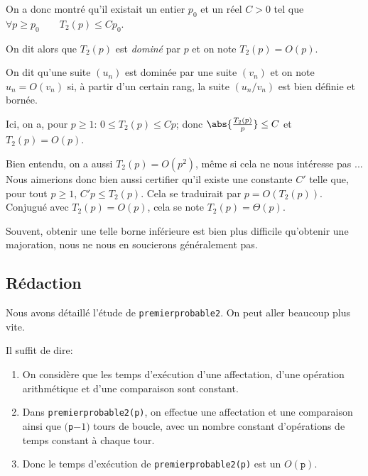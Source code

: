 
On a donc montré qu'il existait un entier $p_{0}$ et un réel $C>0$ tel que
$  \forall p\geq p_0 \qquad T_{2}(p)\leq Cp_0$.

On dit alors que $T_{2}(p)$ est \emph{dominé} par $p$ et on note
$  T_{2}(p) = O(p)$.

\begin{defi}{}
  On dit qu'une suite $(u_{n})$ est dominée par une suite $(v_{n})$ et
  on note $u_{n} = O(v_{n})$ si,  à partir d'un certain rang, la suite
  $(u_{n}/v_{n})$ est bien définie et bornée.  
\end{defi}

Ici, on a, pour $p\geq 1$: $0 \leq T_{2}(p) \leq C p$; donc $ \abs{\frac{T_{2}(p)}{p}} \leq C$ et $T_{2}(p)=O(p)$.

\begin{remarque}
  Bien entendu, on a aussi $T_2(p) = O(p^2)$, même si cela ne nous intéresse pas ... Nous aimerions donc bien aussi certifier qu'il existe une constante $C'$ telle que, pour tout $p\geq 1$, $C'p \leq T_2(p)$. 
  Cela se traduirait par $p = O(T_2(p))$. Conjugué avec $T_2(p) = O(p)$, cela se note $T_2(p) =\Theta(p)$. 
  
  Souvent, obtenir une telle borne inférieure est bien plus difficile qu'obtenir une majoration, nous ne nous en soucierons généralement pas. 
\end{remarque}


\subsection{Rédaction}
Nous avons détaillé l'étude de \lstinline{premierprobable2}. On peut aller
beaucoup plus vite.

Il suffit de dire:

\begin{enumerate}
\item On considère que les temps d'exécution d'une affectation, d'une
  opération arithmétique et d'une comparaison sont constant.
\item Dans \lstinline{premierprobable2(p)}, on effectue une affectation et
  une comparaison ainsi que $($\lstinline{p}$-1)$ tours de boucle, avec un
  nombre constant d'opérations de temps constant à chaque tour.
\item Donc le temps d'exécution de \lstinline{premierprobable2(p)} est un
  $O(\texttt{p})$.
\end{enumerate}

